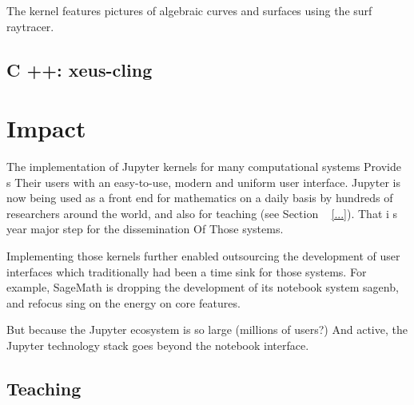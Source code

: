 \documentclass{deliverablereport}
\begin{document}
The \Singular{} kernel features pictures of algebraic curves and surfaces
using the surf raytracer.

\subsection {C ++: xeus-cling}

\section {Impact}

The implementation of Jupyter kernels for many computational systems
Provide s Their users with an easy-to-use, modern and uniform user interface.
Jupyter is now being used as a front end for mathematics on a daily basis by hundreds of researchers
around the world, and also for teaching (see Section ~ \ref {...}).
That i s year major step for the dissemination Of Those systems.

Implementing those kernels further enabled outsourcing the development of user interfaces
which traditionally had been a time sink for those systems.
For example, SageMath is dropping the development of its notebook system sagenb, and
refocus sing on the energy on core features. %

But because the Jupyter ecosystem is so large (millions of users?) And active,
the Jupyter technology stack goes beyond the notebook interface.


\subsection{Teaching}
\end{document}

